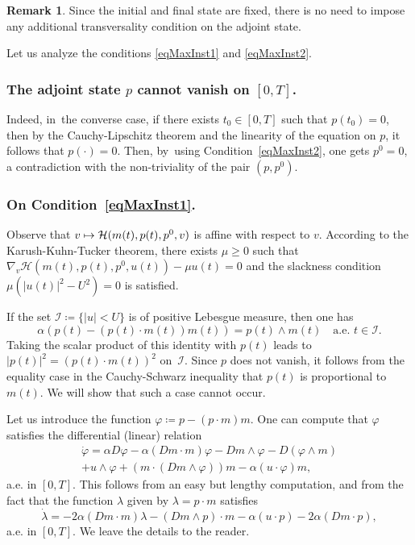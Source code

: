 \documentclass[10pt]{amsart}
\newcommand\mto{\mathchoice{\longmapsto}{\mapsto}{\mapsto}{\mapsto}}
\theoremstyle{definition}
\newtheorem{remark}[theorem]{Remark}
\begin{document}
\begin{remark}
Since the initial and final state are fixed, there is no need to impose any {additional} transversality condition on the adjoint state.
\end{remark}

Let us analyze the conditions \eqref{eqMaxInst1} and \eqref{eqMaxInst2}.

\subsubsection*{The adjoint state $p$ cannot vanish on $[0,T]$.} Indeed, in~the converse case, if there exists $t_0\in [0,T]$ such that $p(t_0)=0$, {then by the Cauchy-Lipschitz theorem and the linearity of the equation on $p$, it follows} that $p(\cdot)=0$. Then, by~using Condition~\eqref{eqMaxInst2}, one gets $p^0=0$, a contradiction with the non-triviality of the pair $(p,p^0)$.

\subsubsection*{On Condition~\eqref{eqMaxInst1}.}
Observe that $v\mto \mathcal{H} (m(t),p(t),p^0,v)$ is affine with respect to $v$. According to the Karush-Kuhn-Tucker theorem, there exists $\mu\geq 0$ such that $\nabla_v \mathcal{H} (m(t),p(t),p^0,u (t))-\mu u (t)=0$ and the slackness condition $\mu(|u (t)|^2-U ^2)=0$ is satisfied.

If the set $\mathcal I \coloneqq \{|u|<U \}$ is of positive Lebesgue measure, then one has \[ \alpha (p(t)-(p(t)\cdot m(t))m(t))=p(t)\wedge m(t) \quad \text{a.e. } t \in \mathcal I. \]
Taking the scalar product of this identity with $p(t)$ leads to $|p(t)|^2=(p(t)\cdot m(t))^2$ on~$\mathcal I$. Since $p$ does not vanish, it follows from the equality case in the Cauchy-Schwarz inequality that $p(t)$ is proportional to $m(t)$. We will show that such a case cannot occur.

Let us introduce the function $\varphi \coloneqq p-(p\cdot m)m$. One can compute that $\varphi$ satisfies the differential (linear) relation
\begin{multline}\label{eq1155}
\dot{\varphi}=\alpha D\varphi-\alpha (Dm\cdot m)\varphi -Dm\wedge \varphi-D(\varphi\wedge m)\\
+ u\wedge \varphi +(m\cdot (Dm\wedge \varphi))m-\alpha (u\cdot \varphi)m,
\end{multline}
a.e. in $[0,T]$. This follows from an easy but lengthy computation, and from the fact that the function $\lambda$ given by $\lambda=p\cdot m$ satisfies
\[
\dot{\lambda}= -2\alpha (Dm\cdot m)\lambda-(Dm\wedge p)\cdot m-\alpha (u\cdot p) - 2 \alpha (Dm \cdot p),
\]
a.e. in $[0,T]$. We leave the details to the reader.
\end{document}
